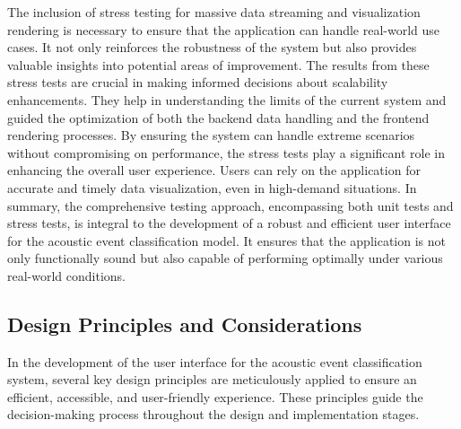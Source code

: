 The inclusion of stress testing for massive data streaming and visualization rendering is necessary to ensure that the application can handle real-world use cases. It not only reinforces the robustness of the system but also provides valuable insights into potential areas of improvement. The results from these stress tests are crucial in making informed decisions about scalability enhancements. They help in understanding the limits of the current system and guided the optimization of both the backend data handling and the frontend rendering processes. By ensuring the system can handle extreme scenarios without compromising on performance, the stress tests play a significant role in enhancing the overall user experience. Users can rely on the application for accurate and timely data visualization, even in high-demand situations. In summary, the comprehensive testing approach, encompassing both unit tests and stress tests, is integral to the development of a robust and efficient user interface for the acoustic event classification model. It ensures that the application is not only functionally sound but also capable of performing optimally under various real-world conditions.

\subsection{Design Principles and Considerations}
In the development of the user interface for the acoustic event classification system, several key design principles are meticulously applied to ensure an efficient, accessible, and user-friendly experience. These principles guide the decision-making process throughout the design and implementation stages.

